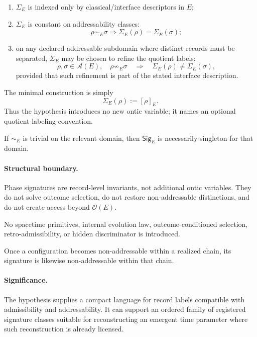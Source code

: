 \documentclass[aps,prx,onecolumn,11pt]{revtex4-2}
\theoremstyle{plain}
\theoremstyle{definition}
\theoremstyle{remark}
\begin{document}
\begin{enumerate}[label=(\roman*), leftmargin=2.2em]
\item \(\Sigma_E\) is indexed only by classical/interface descriptors
in \(E\);
\item \(\Sigma_E\) is constant on addressability classes:
\[
\rho\sim_E\sigma
\Longrightarrow
\Sigma_E(\rho)=\Sigma_E(\sigma);
\]
\item on any declared addressable subdomain where distinct records must
be separated, \(\Sigma_E\) may be chosen to refine the quotient labels:
\begin{equation}
\rho,\sigma\in\mathcal A(E),
\quad
\rho\not\sim_E\sigma
\quad
\Longrightarrow
\quad
\Sigma_E(\rho)\neq\Sigma_E(\sigma),
\label{eq:signature_refines_H}
\end{equation}
provided that such refinement is part of the stated interface
description.
\end{enumerate}

The minimal construction is simply
\[
\Sigma_E(\rho):=[\rho]_E.
\]
Thus the hypothesis introduces no new ontic variable; it names an
optional quotient-labeling convention.

If \(\sim_E\) is trivial on the relevant domain, then
\(\mathsf{Sig}_E\) is necessarily singleton for that domain.

\paragraph{Structural boundary.}

Phase signatures are record-level invariants, not additional ontic
variables. They do not solve outcome selection, do not restore
non-addressable distinctions, and do not create access beyond
\(\mathcal O(E)\).

No spacetime primitives, internal evolution law, outcome-conditioned
selection, retro-admissibility, or hidden discriminator is introduced.

Once a configuration becomes non-addressable within a realized chain,
its signature is likewise non-addressable within that chain.

\paragraph{Significance.}

The hypothesis supplies a compact language for record labels compatible
with admissibility and addressability. It can support an ordered family
of registered signature classes suitable for reconstructing an emergent
time parameter where such reconstruction is already licensed.
\end{document}
